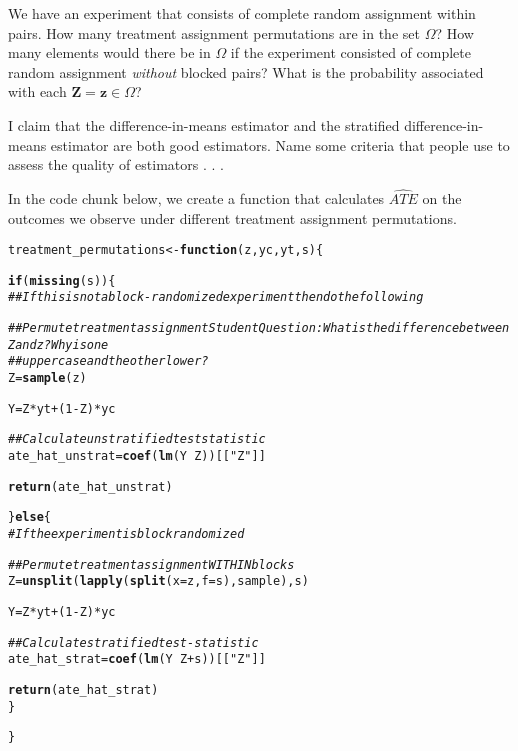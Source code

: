 \documentclass[11pt,leqno]{article}\usepackage[]{graphicx}\usepackage[]{color}
\makeatletter
\newcommand{\hlnum}[1]{\textcolor[rgb]{0.686,0.059,0.569}{#1}}%
\newcommand{\hlstr}[1]{\textcolor[rgb]{0.192,0.494,0.8}{#1}}%
\newcommand{\hlcom}[1]{\textcolor[rgb]{0.678,0.584,0.686}{\textit{#1}}}%
\newcommand{\hlopt}[1]{\textcolor[rgb]{0,0,0}{#1}}%
\newcommand{\hlstd}[1]{\textcolor[rgb]{0.345,0.345,0.345}{#1}}%
\newcommand{\hlkwa}[1]{\textcolor[rgb]{0.161,0.373,0.58}{\textbf{#1}}}%
\newcommand{\hlkwb}[1]{\textcolor[rgb]{0.69,0.353,0.396}{#1}}%
\newcommand{\hlkwc}[1]{\textcolor[rgb]{0.333,0.667,0.333}{#1}}%
\newcommand{\hlkwd}[1]{\textcolor[rgb]{0.737,0.353,0.396}{\textbf{#1}}}%
\newenvironment{kframe}{%
 \def\at@end@of@kframe{}%
 \ifinner\ifhmode%
  \def\at@end@of@kframe{\end{minipage}}%
  \begin{minipage}{\columnwidth}%
 \fi\fi%
 \def\FrameCommand##1{\hskip\@totalleftmargin \hskip-\fboxsep
 \colorbox{shadecolor}{##1}\hskip-\fboxsep
     \hskip-\linewidth \hskip-\@totalleftmargin \hskip\columnwidth}%
 \MakeFramed {\advance\hsize-\width
   \@totalleftmargin\z@ \linewidth\hsize
   \@setminipage}}%
 {\par\unskip\endMakeFramed%
 \at@end@of@kframe}
\newenvironment{knitrout}{}{} %
\theoremstyle{newstyle}
\makeatother
\begin{document}
We have an experiment that consists of complete random assignment within pairs. How many treatment assignment permutations are in the set $\Omega$? How many elements would there be in $\Omega$ if the experiment consisted of complete random assignment \textit{without} blocked pairs? What is the probability associated with each $\mathbf{Z} = \mathbf{z} \in \Omega$?

I claim that the difference-in-means estimator and the stratified difference-in-means estimator are both good estimators. Name some criteria that people use to assess the quality of estimators . . .

In the code chunk below, we create a function that calculates $\widehat{ATE}$ on the outcomes we observe under different treatment assignment permutations.

\begin{knitrout}\footnotesize
{}\color{fgcolor}\begin{kframe}
\begin{alltt}
\hlstd{treatment_permutations} \hlkwb{<-} \hlkwa{function}\hlstd{(}\hlkwc{z}\hlstd{,} \hlkwc{yc}\hlstd{,} \hlkwc{yt}\hlstd{,} \hlkwc{s}\hlstd{) \{}

    \hlkwa{if} \hlstd{(}\hlkwd{missing}\hlstd{(s)) \{}
        \hlcom{## If this is not a block-randomized experiment then do the following}

        \hlcom{## Permute treatment assignment Student Question: What is the difference between Z and z?  Why is one}
        \hlcom{## uppercase and the other lower?}
        \hlstd{Z} \hlkwb{=} \hlkwd{sample}\hlstd{(z)}

        \hlstd{Y} \hlkwb{=} \hlstd{Z} \hlopt{*} \hlstd{yt} \hlopt{+} \hlstd{(}\hlnum{1} \hlopt{-} \hlstd{Z)} \hlopt{*} \hlstd{yc}

        \hlcom{## Calculate unstratified test statistic}
        \hlstd{ate_hat_unstrat} \hlkwb{=} \hlkwd{coef}\hlstd{(}\hlkwd{lm}\hlstd{(Y} \hlopt{~} \hlstd{Z))[[}\hlstr{"Z"}\hlstd{]]}

        \hlkwd{return}\hlstd{(ate_hat_unstrat)}

    \hlstd{\}} \hlkwa{else} \hlstd{\{}
        \hlcom{# If the experiment is block randomized}

        \hlcom{## Permute treatment assignment WITHIN blocks}
        \hlstd{Z} \hlkwb{=} \hlkwd{unsplit}\hlstd{(}\hlkwd{lapply}\hlstd{(}\hlkwd{split}\hlstd{(}\hlkwc{x} \hlstd{= z,} \hlkwc{f} \hlstd{= s), sample), s)}

        \hlstd{Y} \hlkwb{=} \hlstd{Z} \hlopt{*} \hlstd{yt} \hlopt{+} \hlstd{(}\hlnum{1} \hlopt{-} \hlstd{Z)} \hlopt{*} \hlstd{yc}

        \hlcom{## Calculate stratified test-statistic}
        \hlstd{ate_hat_strat} \hlkwb{=} \hlkwd{coef}\hlstd{(}\hlkwd{lm}\hlstd{(Y} \hlopt{~} \hlstd{Z} \hlopt{+} \hlstd{s))[[}\hlstr{"Z"}\hlstd{]]}

        \hlkwd{return}\hlstd{(ate_hat_strat)}
    \hlstd{\}}

\hlstd{\}}
\end{alltt}
\end{kframe}
\end{knitrout}
\end{document}
